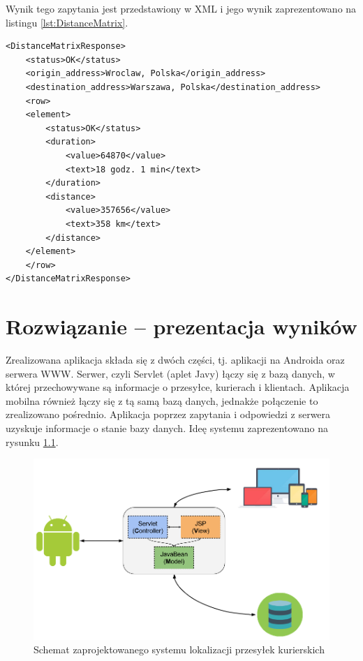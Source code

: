 \documentclass[eng,printmode,oneside]{mgr}
\begin{document}
Wynik tego zapytania jest przedstawiony w XML i jego wynik zaprezentowano na
listingu \ref{lst:DistanceMatrix}.

\begin{lstlisting}[caption=Przykład odpowiedzi na zapytanie
\texttt{DistanceMatrix}\, trasa Wrocław -- Warszawa,label=lst:DistanceMatrix] 
<DistanceMatrixResponse>
	<status>OK</status>
	<origin_address>Wroclaw, Polska</origin_address>
	<destination_address>Warszawa, Polska</destination_address>
	<row>
	<element>
		<status>OK</status>
		<duration>
			<value>64870</value>
			<text>18 godz. 1 min</text>
		</duration>
		<distance>
			<value>357656</value>
			<text>358 km</text>
		</distance>
	</element>
	</row>
</DistanceMatrixResponse>
\end{lstlisting}

\chapter{Rozwiązanie -- prezentacja wyników}

Zrealizowana aplikacja składa się z dwóch części, tj. aplikacji na Androida oraz
serwera WWW. Serwer, czyli Servlet (aplet Javy) łączy się z bazą
danych, w której przechowywane są informacje o przesyłce, kurierach i
klientach. Aplikacja mobilna również łączy się z tą samą bazą danych,
jednakże połączenie to zrealizowano pośrednio. Aplikacja poprzez zapytania i odpowiedzi z
serwera uzyskuje informacje o stanie bazy danych. Ideę systemu zaprezentowano na
rysunku \ref{StrukturaSystemu}. 

\begin{figure}[h]
\centering
\includegraphics[width=1\textwidth]{StrukturaSystemu.png}
\caption{Schemat zaprojektowanego systemu lokalizacji przesyłek kurierskich}
\label{StrukturaSystemu}
\end{figure}
\end{document}
